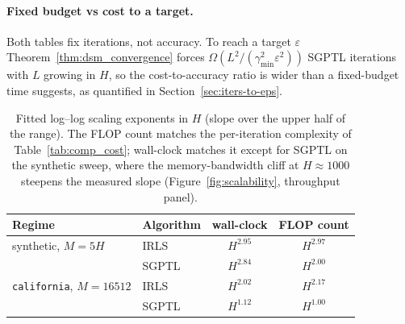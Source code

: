 \paragraph{Fixed budget vs cost to a target.}
Both tables fix iterations, not accuracy. To reach a target $\varepsilon$
Theorem~\ref{thm:dsm_convergence} forces
$\Omega(L^{2}/(\gamma_{\min}^{2}\varepsilon^{2}))$ SGPTL iterations with $L$
growing in $H$, so the cost-to-accuracy ratio is wider than a fixed-budget time
suggests, as quantified in Section~\ref{sec:iters-to-eps}.

\begin{table}[H]
    \centering
    \begin{tabular}{llcc}
        \toprule
        Regime & Algorithm & wall-clock & FLOP count \\
        \midrule
        synthetic, $M=5H$       & IRLS  & $H^{2.95}$ & $H^{2.97}$ \\
                                & SGPTL & $H^{2.84}$ & $H^{2.00}$ \\
        \midrule
        \texttt{california}, $M=16512$ & IRLS  & $H^{2.02}$ & $H^{2.17}$ \\
                                & SGPTL & $H^{1.12}$ & $H^{1.00}$ \\
        \bottomrule
    \end{tabular}
    \caption{Fitted log--log scaling exponents in $H$ (slope over the upper
    half of the range). The FLOP count matches the per-iteration complexity of
    Table~\ref{tab:comp_cost}; wall-clock matches it except for SGPTL on the
    synthetic sweep, where the memory-bandwidth cliff at $H\approx1000$ steepens
    the measured slope (Figure~\ref{fig:scalability}, throughput panel).}
    \label{tab:scalability}
\end{table}

